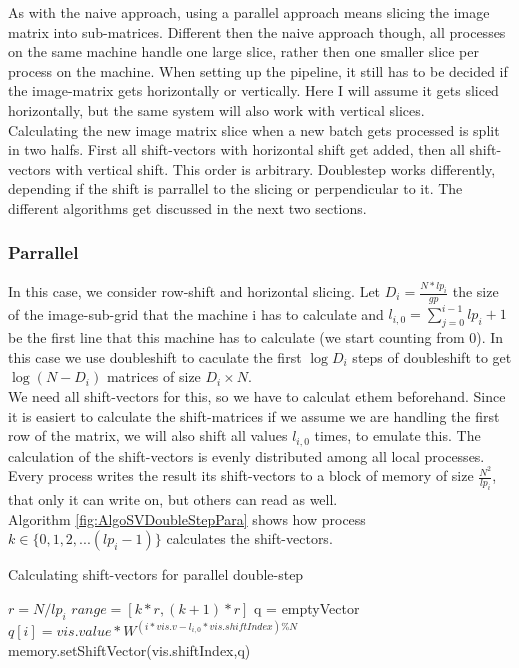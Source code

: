 \documentclass[12pt]{article}
\begin{document}
As with the naive approach, using a parallel approach means slicing the image matrix into sub-matrices. Different then the naive approach though, all processes on the same machine handle one large slice, rather then one smaller slice per process on the machine. When setting up the pipeline, it still has to be decided if the image-matrix gets horizontally or vertically. Here I will assume it gets sliced horizontally, but the same system will also work with vertical slices.\\

Calculating the new image matrix slice when a new batch gets processed is split in two halfs. First all shift-vectors with horizontal shift get added, then all shift-vectors with vertical shift. This order is arbitrary. Doublestep works differently, depending if the shift is parrallel to the slicing or perpendicular to it. The different algorithms get discussed in the next two sections.

\subsubsection{ Parrallel }

In this case, we consider row-shift and horizontal slicing. Let $D_i=\frac{N*lp_i}{gp}$ the size of the image-sub-grid that the machine i has to calculate and $l_{i,0}=\sum_{j=0}^{i-1}lp_i+1$ be the first line that this machine has to calculate (we start counting from 0). In this case we use doubleshift to caculate the first $\log{D_i}$ steps of doubleshift to get $\log{(N-D_i)}$ matrices of size $D_i \times N$.\\

We need all shift-vectors for this, so we have to calculat ethem beforehand. Since it is easiert to calculate the shift-matrices if we assume we are handling the first row of the matrix, we will also shift all values $l_ {i,0}$ times, to emulate this. The calculation of the shift-vectors is evenly distributed among all local processes. Every process writes the result its shift-vectors to a block of memory of size  $\frac{N^2}{lp_i}$, that only it can write on, but others can read as well.\\

Algorithm \ref{fig:AlgoSVDoubleStepPara} shows how process $k\in \{0,1,2,...(lp_i-1)\}$ calculates the shift-vectors. \\

\begin{algorithm}
\caption{Calculating shift-vectors for parallel double-step}\label{euclid}
\label{fig:AlgoSVDoubleStepPara}
\begin{algorithmic}[1]
\State $r = N/lp_i$
\State $range = [k*r,(k+1)*r]$
      \State q = emptyVector
            \State $q[i]=vis.value*W^{(i*vis.v-l_{i,0}*vis.shiftIndex)\%N}$
      \EndFor
      \State memory.setShiftVector(vis.shiftIndex,q)
\EndFor
\end{algorithmic}
\end{algorithm}
\end{document}
